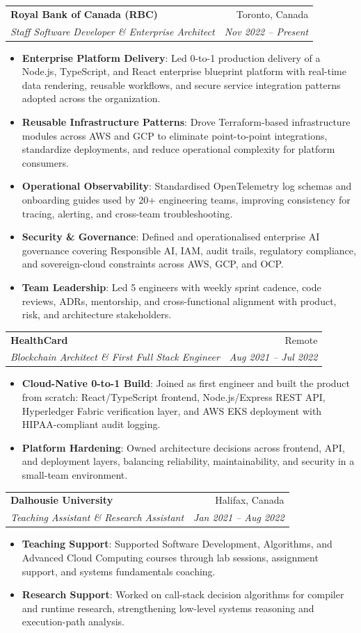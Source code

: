 \documentclass[letterpaper,9.5pt]{article}
\makeatletter
\newcommand{\resumeItem}[2]{
  \item\small{
    \textbf{#1}{: #2 \vspace{-2pt}}
  }
}
\newcommand{\resumeSubheading}[4]{
  \vspace{-1pt}\item
    \begin{tabular*}{0.97\textwidth}{l@{\extracolsep{\fill}}r}
      \textbf{#1} & #2 \\
      \textit{\small#3} & \textit{\small #4} \\
    \end{tabular*}\vspace{-5pt}
}
\newcommand{\resumeItemListStart}{\begin{itemize}}
\newcommand{\resumeItemListEnd}{\end{itemize}\vspace{-5pt}}
\makeatother
\begin{document}
  \resumeSubheading
    {Royal Bank of Canada (RBC)}{Toronto, Canada}
    {Staff Software Developer \& Enterprise Architect}{Nov 2022 -- Present}
    \resumeItemListStart
      \resumeItem{Enterprise Platform Delivery}
        {Led 0-to-1 production delivery of a Node.js, TypeScript, and React enterprise blueprint platform with real-time data rendering, reusable workflows, and secure service integration patterns adopted across the organization.}
      \resumeItem{Reusable Infrastructure Patterns}
        {Drove Terraform-based infrastructure modules across AWS and GCP to eliminate point-to-point integrations, standardize deployments, and reduce operational complexity for platform consumers.}
      \resumeItem{Operational Observability}
        {Standardised OpenTelemetry log schemas and onboarding guides used by 20+ engineering teams, improving consistency for tracing, alerting, and cross-team troubleshooting.}
      \resumeItem{Security \& Governance}
        {Defined and operationalised enterprise AI governance covering Responsible AI, IAM, audit trails, regulatory compliance, and sovereign-cloud constraints across AWS, GCP, and OCP.}
      \resumeItem{Team Leadership}
        {Led 5 engineers with weekly sprint cadence, code reviews, ADRs, mentorship, and cross-functional alignment with product, risk, and architecture stakeholders.}
    \resumeItemListEnd

  \resumeSubheading
    {HealthCard}{Remote}
    {Blockchain Architect \& First Full Stack Engineer}{Aug 2021 -- Jul 2022}
    \resumeItemListStart
      \resumeItem{Cloud-Native 0-to-1 Build}
        {Joined as first engineer and built the product from scratch: React/TypeScript frontend, Node.js/Express REST API, Hyperledger Fabric verification layer, and AWS EKS deployment with HIPAA-compliant audit logging.}
      \resumeItem{Platform Hardening}
        {Owned architecture decisions across frontend, API, and deployment layers, balancing reliability, maintainability, and security in a small-team environment.}
    \resumeItemListEnd

  \resumeSubheading
    {Dalhousie University}{Halifax, Canada}
    {Teaching Assistant \& Research Assistant}{Jan 2021 -- Aug 2022}
    \resumeItemListStart
      \resumeItem{Teaching Support}
        {Supported Software Development, Algorithms, and Advanced Cloud Computing courses through lab sessions, assignment support, and systems fundamentals coaching.}
      \resumeItem{Research Support}
        {Worked on call-stack decision algorithms for compiler and runtime research, strengthening low-level systems reasoning and execution-path analysis.}
    \resumeItemListEnd
\end{document}
